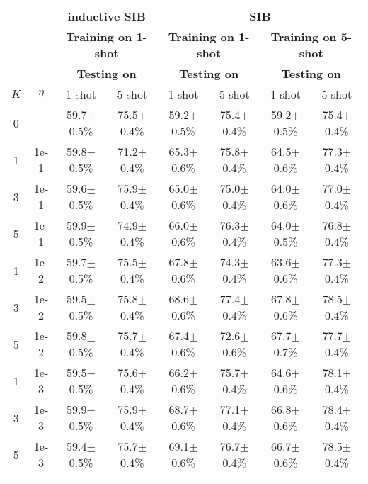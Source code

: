 \documentclass{article} \usepackage{iclr2020_conference,times}
\begin{document}
\label{sec:cifar}
\begin{table}[ht]
\centering
\footnotesize
\begin{tabular}{ c c | c c | c c | c c}
\toprule
 & & \multicolumn{2}{c|}{\textbf{inductive SIB}} & \multicolumn{4}{c}{\textbf{SIB}} \\
 & & \multicolumn{2}{c|}{\textbf{Training on 1-shot}} & \multicolumn{2}{c|}{\textbf{Training on 1-shot}} & \multicolumn{2}{c}{\textbf{Training on 5-shot}} \\
 & & \multicolumn{2}{c|}{\textbf{Testing on}} & \multicolumn{2}{c|}{\textbf{Testing on}} & \multicolumn{2}{c}{\textbf{Testing on}} \\
  $K$ & $\eta$ & 1-shot & 5-shot & 1-shot & 5-shot & 1-shot & 5-shot \\
\midrule
0 & - & 59.7$\pm$0.5\% & 75.5$\pm$0.4\% & 59.2$\pm$0.5\% & 75.4$\pm$0.4\% & 59.2$\pm$0.5\% & 75.4$\pm$0.4\% \\\hdashline

1 & 1e-1 & 59.8$\pm$0.5\% & 71.2$\pm$0.4\% & 65.3$\pm$0.6\% & 75.8$\pm$0.4\% & 64.5$\pm$0.6\% & 77.3$\pm$0.4\% \\
3 & 1e-1 & 59.6$\pm$0.5\% & 75.9$\pm$0.4\% & 65.0$\pm$0.6\% & 75.0$\pm$0.4\% & 64.0$\pm$0.6\% & 77.0$\pm$0.4\% \\
5 & 1e-1 & 59.9$\pm$0.5\% & 74.9$\pm$0.4\% & 66.0$\pm$0.6\% & 76.3$\pm$0.4\% & 64.0$\pm$0.5\% & 76.8$\pm$0.4\% \\\hdashline

1 & 1e-2 & 59.7$\pm$0.5\% & 75.5$\pm$0.4\% & 67.8$\pm$0.6\% & 74.3$\pm$0.4\% &  63.6$\pm$0.6\%& 77.3$\pm$0.4\% \\
3 & 1e-2 & 59.5$\pm$0.5\% & 75.8$\pm$0.4\% & 68.6$\pm$0.6\% & 77.4$\pm$0.4\% & 67.8$\pm$0.6\% & 78.5$\pm$0.4\% \\
5 & 1e-2 & 59.8$\pm$0.5\% & 75.7$\pm$0.4\% & 67.4$\pm$0.6\% & 72.6$\pm$0.6\% & 67.7$\pm$0.7\% & 77.7$\pm$0.4\% \\\hdashline

1 & 1e-3 & 59.5$\pm$0.5\% & 75.6$\pm$0.4\% & 66.2$\pm$0.6\% & 75.7$\pm$0.4\% & 64.6$\pm$0.6\% & 78.1$\pm$0.4\% \\
3 & 1e-3 & 59.9$\pm$0.5\% & 75.9$\pm$0.4\% & 68.7$\pm$0.6\% & 77.1$\pm$0.4\% & 66.8$\pm$0.6\% & 78.4$\pm$0.4\% \\
5 & 1e-3 & 59.4$\pm$0.5\% & 75.7$\pm$0.4\% & 69.1$\pm$0.6\% & 76.7$\pm$0.4\% & 66.7$\pm$0.6\% & 78.5$\pm$0.4\% \\\hdashline


\end{tabular}
\end{table}
\end{document}
